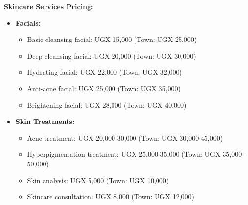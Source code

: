 \documentclass[a4paper,12pt]{article}
\begin{document}
\textbf{Skincare Services Pricing:}
\begin{itemize}[leftmargin=2em]
    \item \textbf{Facials:}
    \begin{itemize}
        \item Basic cleansing facial: UGX 15,000 (Town: UGX 25,000)
        \item Deep cleansing facial: UGX 20,000 (Town: UGX 30,000)
        \item Hydrating facial: UGX 22,000 (Town: UGX 32,000)
        \item Anti-acne facial: UGX 25,000 (Town: UGX 35,000)
        \item Brightening facial: UGX 28,000 (Town: UGX 40,000)
    \end{itemize}
    
    \item \textbf{Skin Treatments:}
    \begin{itemize}
        \item Acne treatment: UGX 20,000-30,000 (Town: UGX 30,000-45,000)
        \item Hyperpigmentation treatment: UGX 25,000-35,000 (Town: UGX 35,000-50,000)
        \item Skin analysis: UGX 5,000 (Town: UGX 10,000)
        \item Skincare consultation: UGX 8,000 (Town: UGX 12,000)
    \end{itemize}
\end{itemize}
\end{document}
